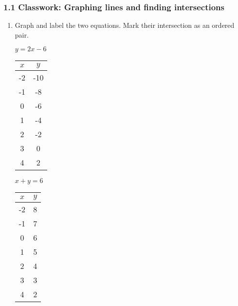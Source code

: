 \documentclass[12pt, twoside]{article}
\begin{document}
\subsubsection*{1.1 Classwork: Graphing lines and finding intersections}
\begin{enumerate}
  \item Graph and label the two equations. Mark their intersection as an ordered pair.

  \begin{multicols}{2}
    $y = 2x-6$
    \begin{flushleft}
      \begin{tabular}{c|c}
        $x$ & $y$ \\
          \hline
          -2 & -10 \\
          -1 & -8 \\
          0 & -6 \\
          1 & -4 \\
          2 & -2 \\
          3 & 0 \\
          4 & 2 \\
      \end{tabular}
      \end{flushleft}

    $x+y = 6$
      \begin{flushleft}
        \begin{tabular}{c|c}
          $x$ & $y$ \\
            \hline
                -2 & 8 \\
                -1 & 7 \\
                0 & 6 \\
                1 & 5 \\
                2 & 4 \\
                3 & 3 \\
                4 & 2 \\
        \end{tabular}
        \end{flushleft}
    \end{multicols}

  \begin{center} %
  \end{center}

  
\end{enumerate}
\end{document}
